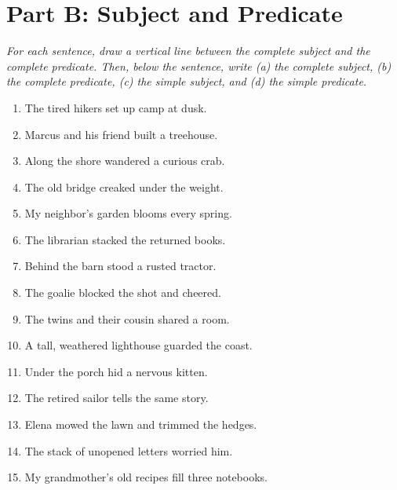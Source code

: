 \documentclass[11pt]{article}
\begin{document}
\section*{Part B: Subject and Predicate}
\noindent\textit{For each sentence, draw a vertical line between the complete subject and the complete predicate. Then, below the sentence, write (a) the complete subject, (b) the complete predicate, (c) the simple subject, and (d) the simple predicate.}
\begin{enumerate}
  \item The tired hikers set up camp at dusk.
  \vspace{0.8in}
  \item Marcus and his friend built a treehouse.
  \vspace{0.8in}
  \item Along the shore wandered a curious crab.
  \vspace{0.8in}
  \item The old bridge creaked under the weight.
  \vspace{0.8in}
  \item My neighbor's garden blooms every spring.
  \vspace{0.8in}
  \item The librarian stacked the returned books.
  \vspace{0.8in}
  \item Behind the barn stood a rusted tractor.
  \vspace{0.8in}
  \item The goalie blocked the shot and cheered.
  \vspace{0.8in}
  \item The twins and their cousin shared a room.
  \vspace{0.8in}
  \item A tall, weathered lighthouse guarded the coast.
  \vspace{0.8in}
  \item Under the porch hid a nervous kitten.
  \vspace{0.8in}
  \item The retired sailor tells the same story.
  \vspace{0.8in}
  \item Elena mowed the lawn and trimmed the hedges.
  \vspace{0.8in}
  \item The stack of unopened letters worried him.
  \vspace{0.8in}
  \item My grandmother's old recipes fill three notebooks.

\end{enumerate}
\end{document}
